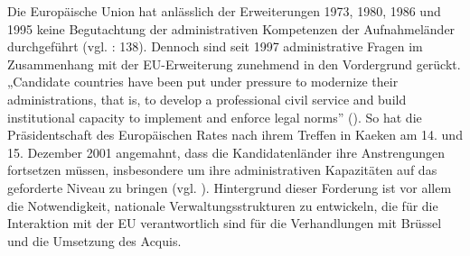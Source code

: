 Die Europäische Union hat anlässlich der Erweiterungen 1973, 1980, 1986 und 1995 keine Begutachtung der administrativen Kompetenzen der Aufnahmeländer durchgeführt (vgl. \cite{ziller} : 138). Dennoch sind seit 1997 administrative Fragen im Zusammenhang mit der EU-Erweiterung zunehmend in den Vordergrund gerückt. „Candidate countries have been put under pressure to modernize their administrations, that is, to develop a professional civil service and build institutional capacity to implement and enforce legal norms” (\cite{olsen}). So hat die Präsidentschaft des Europäischen Rates nach ihrem Treffen in Kaeken am 14. und 15. Dezember 2001 angemahnt, dass die Kandidatenländer ihre Anstrengungen fortsetzen müssen, insbesondere um ihre administrativen Kapazitäten auf das geforderte Niveau zu bringen (vgl. \cite{olsen}). Hintergrund dieser Forderung ist vor allem die Notwendigkeit, nationale Verwaltungsstrukturen zu entwickeln, die für die Interaktion mit der EU verantwortlich sind für die Verhandlungen mit Brüssel und die Umsetzung des Acquis.

